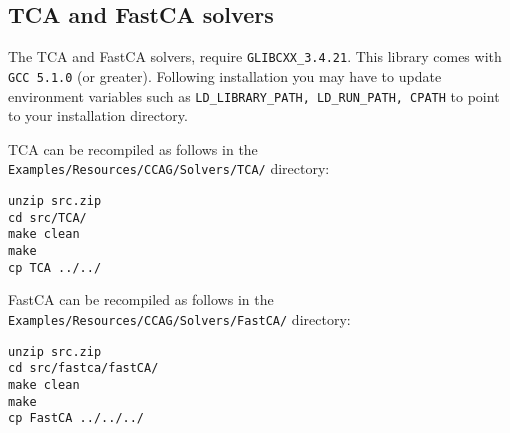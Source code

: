 \documentclass{article}
\begin{document}
\subsection{TCA and FastCA solvers}
The TCA and FastCA solvers, require \texttt{GLIBCXX\_3.4.21}. This library comes with \texttt{GCC 5.1.0} (or greater). Following installation you may have to update environment variables such as \texttt{LD\_LIBRARY\_PATH, LD\_RUN\_PATH, CPATH} to point to your installation directory.

TCA can be recompiled as follows in the \texttt{Examples/Resources/CCAG/Solvers/TCA/} directory:
\begin{Verbatim}[frame=single]
unzip src.zip
cd src/TCA/
make clean
make
cp TCA ../../
\end{Verbatim}

FastCA can be recompiled as follows in the \texttt{Examples/Resources/CCAG/Solvers/FastCA/} directory:
\begin{Verbatim}[frame=single]
unzip src.zip
cd src/fastca/fastCA/
make clean
make
cp FastCA ../../../
\end{Verbatim}
\end{document}
